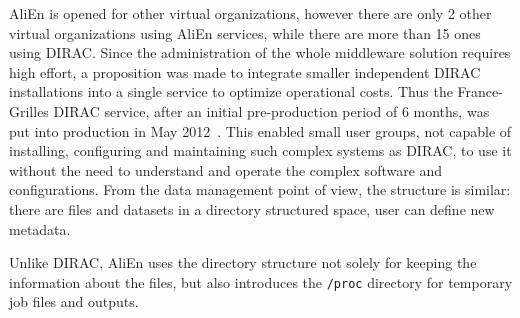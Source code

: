 AliEn is opened for other virtual organizations, however there are only 2 other virtual organizations using 
AliEn services, while there are more than 15 ones using DIRAC. Since the administration of the whole middleware 
solution requires high effort, a proposition was made to integrate smaller independent DIRAC installations into 
a single service to optimize operational costs. Thus the France-Grilles DIRAC service, 
after an initial pre-production period of 6 months, was put into production in May 2012~\cite{FGDIRAC}.
This enabled small user groups, not capable of installing, configuring and maintaining  
such complex systems as DIRAC, to use it without the need to understand and operate the complex software and
configurations. From the data management point of view, the  structure is similar: there are files and datasets in a 
directory structured space, user can define new metadata.


Unlike DIRAC, AliEn uses the directory structure not solely for keeping the information about the files, 
but also introduces the \texttt{/proc} directory for temporary job files and outputs.